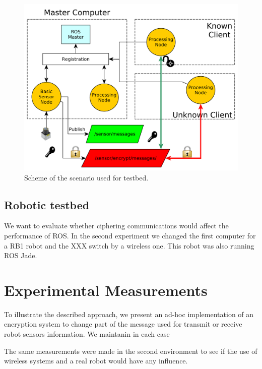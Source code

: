 \documentclass[journal,twoside]{JoPhA}
\begin{document}
\begin{figure}[ht]
    \centering
    \includegraphics[width=.5\textwidth]{TestBed.pdf}
    \caption{Scheme of the scenario used for testbed.}
  \label{fig:TestBed}
\end{figure}




\subsection{Robotic testbed}

We want to evaluate whether ciphering communications would affect the performance of ROS. 
In the second experiment we changed the first computer for a RB1 robot and the XXX switch by a wireless one. This robot was also running ROS Jade.



\section{Experimental Measurements}

To illustrate the described approach, we present an ad-hoc implementation of an encryption system to change part of the message used for transmit or receive robot sensors information. 
We maintanin in each case 


The same measurements were made in the second environment to see if the use of wireless systems and a real robot would have any influence.


\end{document}
